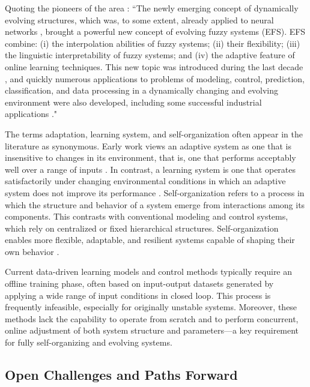 \documentclass[conference]{IEEEtran}
\begin{document}
Quoting the pioneers of the area \cite{plamen2008}: ``The newly emerging concept of dynamically evolving structures, which was, to some extent, already applied to neural networks \cite{fritzke1994}, brought a powerful new concept of evolving fuzzy systems (EFS). EFS combine: (i) the interpolation abilities of fuzzy systems; (ii) their flexibility; (iii) the linguistic interpretability of fuzzy systems; and (iv) the adaptive feature of online learning techniques. This new topic was introduced during the last decade \cite{kasabov2002, plamen2002, plamen2004}, and quickly numerous applications to problems of modeling, control, prediction, classification, and data processing in a dynamically changing and evolving environment were also developed, including some successful industrial applications \cite{kordon2006}."

The terms adaptation, learning system, and self-organization often appear in the literature as synonymous. Early work views an adaptive system as one that is insensitive to changes in its environment, that is, one that performs acceptably well over a range of inputs \cite{zadeh1963}. In contrast, a learning system is one that operates satisfactorily under changing environmental conditions in which an adaptive system does not improve its performance \cite{hill1965}. Self-organization refers to a process in which the structure and behavior of a system emerge from interactions among its components. This contrasts with conventional modeling and control systems, which rely on centralized or fixed hierarchical structures. Self-organization enables more flexible, adaptable, and resilient systems capable of shaping their own behavior \cite{saridis1975}.

Current data-driven learning models and control methods typically require an offline training phase, often based on input-output datasets generated by applying a wide range of input conditions in closed loop. This process is frequently infeasible, especially for originally unstable systems. Moreover, these methods lack the capability to operate from scratch and to perform concurrent, online adjustment of both system structure and parameters—a key requirement for fully self-organizing and evolving systems.


\subsection{Open Challenges and Paths Forward}
\end{document}
